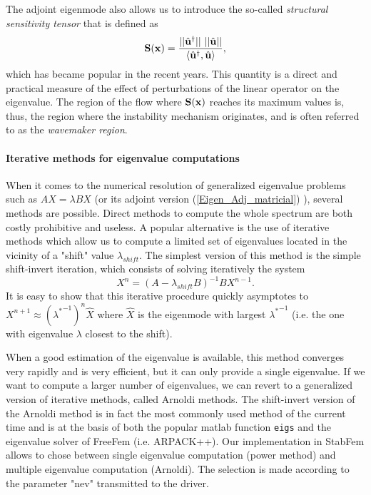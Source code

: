 \documentclass[twocolumn,10pt]{asme2ej}
\newcommand{\be}[1]{ \begin{equation} \label{#1}}
\newcommand{\ee}{\end{equation}}
\begin{document}
The adjoint eigenmode also allows us to introduce the so-called {\em structural sensitivity tensor } that is defined as 
\be{Structursens} 
{\bf{S}}({\bf{x}}) = \frac{|| \hat{\bf u}^\dag|| \,\, ||\hat{\bf u}|| }{{\left<\hat{\bf u}^\dag, \hat{\bf u}\right>}},
\ee 
which has became popular in the recent years.
This quantity is a direct and practical measure of the effect of perturbations of the linear operator on the eigenvalue. The region of the flow where ${\bf{S}}({\bf{x}})$ reaches its maximum values is, thus, the region where the instability mechanism originates, and is often referred to as the {\em wavemaker region}.


\paragraph{Iterative methods for eigenvalue computations}

When it comes to the numerical resolution of generalized eigenvalue problems such as $A X = \lambda B X$ (or its adjoint version (\ref{Eigen_Adj_matricial}) ), several methods are possible. Direct methods to compute the whole spectrum are both costly prohibitive and useless. A popular alternative is the use of iterative methods which allow us to compute a limited set of eigenvalues located in the vicinity of a 
"shift" value $\lambda_{shift}$. The simplest version of this method is the simple shift-invert iteration, which consists of solving iteratively the system
$$
X^{n} =  (A- \lambda_{shift} B)^{-1} B X^{n-1}.
$$ 
It is easy to show that this iterative procedure quickly asymptotes to $X^{n+1} \approx ({\lambda^*}^{-1})^n \hat{X}$
where $\hat{X}$ is the eigenmode with largest ${\lambda^*}^{-1}$ (i.e. the one with eigenvalue $\lambda$ closest to the shift). 


When a good estimation of the eigenvalue is available, this method converges very rapidly and is very efficient, but it can only provide a single eigenvalue.
If we want to compute a larger number of eigenvalues, we can revert to a generalized version of iterative methods, called Arnoldi methods\cite{Arnoldi51}. The shift-invert version of the Arnoldi method is in fact the most commonly used method of the current time and is at the basis of both the popular matlab function {\tt{eigs}} and the eigenvalue solver of FreeFem (i.e. ARPACK++). Our implementation in StabFem allows to chose between single eigenvalue computation (power method) and multiple eigenvalue computation (Arnoldi). The selection is made according to the parameter "nev" transmitted to the driver.
\end{document}
